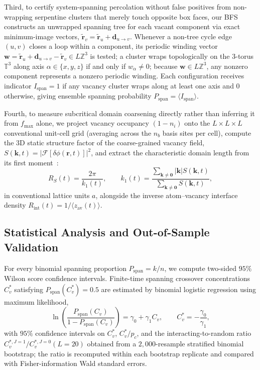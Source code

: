 \documentclass[aps,pre,reprint,superscriptaddress,amsmath,amssymb,floatfix]{revtex4-2}
\begin{document}
Third, to certify system-spanning percolation without false positives from non-wrapping serpentine clusters that merely touch opposite box faces, our BFS constructs an unwrapped spanning tree for each vacant component via exact minimum-image vectors, $\tilde{\mathbf{r}}_v = \tilde{\mathbf{r}}_u + \mathbf{d}_{u \to v}$. Whenever a non-tree cycle edge $(u,v)$ closes a loop within a component, its periodic winding vector $\mathbf{w} = \tilde{\mathbf{r}}_u + \mathbf{d}_{u \to v} - \tilde{\mathbf{r}}_v \in L\mathbb{Z}^3$ is tested; a cluster wraps topologically on the $3$-torus $\mathbb{T}^3$ along axis $\alpha \in \{x,y,z\}$ if and only if $w_\alpha \neq 0$; because $\mathbf{w} \in L\mathbb{Z}^3$, any nonzero component represents a nonzero periodic winding. Each configuration receives indicator $I_{\mathrm{span}} = 1$ if any vacancy cluster wraps along at least one axis and $0$ otherwise, giving ensemble spanning probability $P_{\mathrm{span}} = \langle I_{\mathrm{span}} \rangle$.

Fourth, to measure subcritical domain coarsening directly rather than inferring it from $f_{\max}$ alone, we project vacancy occupancy $(1 - n_i)$ onto the $L \times L \times L$ conventional unit-cell grid (averaging across the $n_b$ basis sites per cell), compute the $3\mathrm{D}$ static structure factor of the coarse-grained vacancy field, $S(\mathbf{k}, t) = |\mathcal{F}[\delta\phi(\mathbf{r}, t)]|^2$, and extract the characteristic domain length from its first moment~\cite{Huse1986,Amar1988,Majumder2011}:
\begin{equation}
  R_S(t) = \frac{2\pi}{k_1(t)}, \qquad k_1(t) = \frac{\sum_{\mathbf{k} \neq \mathbf{0}} |\mathbf{k}| S(\mathbf{k}, t)}{\sum_{\mathbf{k} \neq \mathbf{0}} S(\mathbf{k}, t)},
  \label{eq:structure_factor_R}
\end{equation}
in conventional lattice units $a$, alongside the inverse atom--vacancy interface density $R_{\mathrm{int}}(t) = 1 / \langle z_{\mathrm{av}}(t) \rangle$.

\subsection{Statistical Analysis and Out-of-Sample Validation}
\label{sec:stats_methods}

For every binomial spanning proportion $P_{\mathrm{span}} = k/n$, we compute two-sided $95\%$ Wilson score confidence intervals. Finite-time spanning crossover concentrations $C_v^*$ satisfying $P_{\mathrm{span}}(C_v^*) = 0.5$ are estimated by binomial logistic regression using maximum likelihood,
\begin{equation}
  \ln\!\left(\frac{P_{\mathrm{span}}(C_v)}{1 - P_{\mathrm{span}}(C_v)}\right) = \gamma_0 + \gamma_1 C_v, \qquad C_v^* = -\frac{\gamma_0}{\gamma_1},
  \label{eq:logistic}
\end{equation}
with $95\%$ confidence intervals on $C_v^*$, $C_v^*/p_c$, and the interacting-to-random ratio $C_v^{*,J=1}/C_v^{*,J=0}(L=20)$ obtained from a $2{,}000$-resample stratified binomial bootstrap; the ratio is recomputed within each bootstrap replicate and compared with Fisher-information Wald standard errors.
\end{document}
